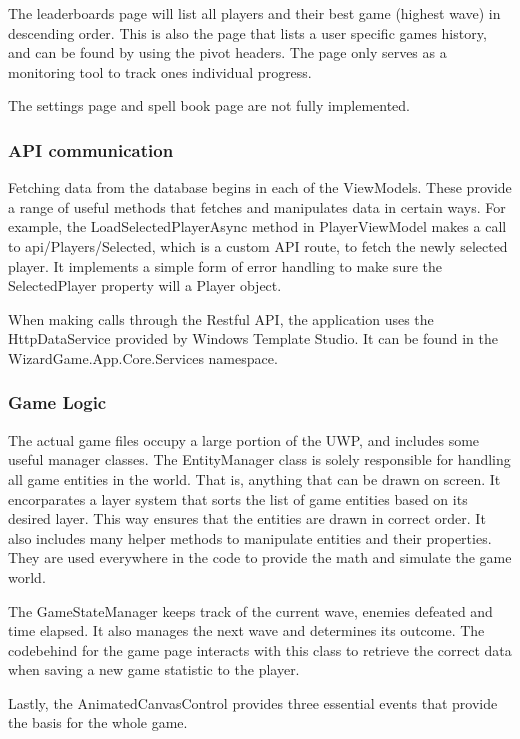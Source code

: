 \documentclass[12pt]{article}
\begin{document}
        The leaderboards page will list all players and their best game (highest wave) in descending order. This is also the page that lists a user specific games history, and can be found by using the pivot headers. The page only serves as a monitoring tool to track ones individual progress.
        
        The settings page and spell book page are not fully implemented.

        \subsubsection{API communication}

        Fetching data from the database begins in each of the ViewModels. These provide a range of useful methods that fetches and manipulates data in certain ways. For example, the LoadSelectedPlayerAsync method in PlayerViewModel makes a call to api/Players/Selected, which is a custom API route, to fetch the newly selected player. It implements a simple form of error handling to make sure the SelectedPlayer property will a Player object.

        When making calls through the Restful API, the application uses the HttpDataService provided by Windows Template Studio. It can be found in the WizardGame.App.Core.Services namespace.

        \subsubsection{Game Logic}

        The actual game files occupy a large portion of the UWP, and includes some useful manager classes. The EntityManager class is solely responsible for handling all game entities in the world. That is, anything that can be drawn on screen. It encorparates a layer system that sorts the list of game entities based on its desired layer. This way ensures that the entities are drawn in correct order. It also includes many helper methods to manipulate entities and their properties. They are used everywhere in the code to provide the math and simulate the game world.

        The GameStateManager keeps track of the current wave, enemies defeated and time elapsed. It also manages the next wave and determines its outcome. The codebehind for the game page interacts with this class to retrieve the correct data when saving a new game statistic to the player.

        Lastly, the AnimatedCanvasControl provides three essential events that provide the basis for the whole game. 
\end{document}
